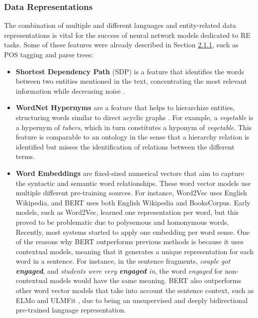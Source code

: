 \hypertarget{2.1.4.4}{\subsubsection{Data Representations}}

The combination of multiple and different languages and entity-related data representations is vital for the success of neural network models dedicated to RE tasks. Some of these features were already described in Section \hyperlink{2.1.1}{2.1.1}, such as POS tagging and parse trees:

\begin{itemize}
    \item \textbf{Shortest Dependency Path} (SDP) is a feature that identifies the words between two entities mentioned in the text, concentrating the most relevant information while decreasing noise \citep{xu2015classifying}. 
    \item \textbf{WordNet Hypernyms} are a feature that helps to hierarchize entities, structuring words similar to direct acyclic graphs \citep{miller1998wordnet}. For example, a \textit{vegetable} is a hypernym of \textit{tubers}, which in turn constitutes a hyponym of \textit{vegetable}. This feature is comparable to an ontology in the sense that a hierarchy relation is identified but misses the identification of relations between the different terms.
    \item \textbf{Word Embeddings} are fixed-sized numerical vectors that aim to capture the syntactic and semantic word relationships. These word vector models use multiple different pre-training sources. For instance, Word2Vec \citep{mikolov2013distributed} uses English Wikipedia, and BERT \citep{devlin2019bert} uses both English Wikipedia and BooksCorpus. 
    Early models, such as Word2Vec, learned one representation per word, but this proved to be problematic due to polysemous and homonymous words. Recently, most systems started to apply one embedding per word sense. One of the reasons why BERT outperforms previous methods is because it uses contextual models, meaning that it generates a unique representation for each word in a sentence. For instance, in the sentence fragments, \textit{couple got \textbf{engaged}}, and \textit{students were very \textbf{engaged} in}, the word \textit{engaged} for non-contextual models would have the same meaning. BERT also outperforms other word vector models that take into account the sentence context, such as ELMo \citep{peters2018deep} and ULMFit \citep{howard2018universal}, due to being an unsupervised and deeply bidirectional pre-trained language representation.
\end{itemize}

